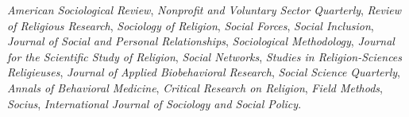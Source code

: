  \emph{American Sociological Review},
 \emph{Nonproﬁt and Voluntary Sector Quarterly},
 \emph{Review of Religious Research},
 \emph{Sociology of Religion},
 \emph{Social Forces},
 \emph{Social Inclusion},
 \emph{Journal of Social and Personal Relationships},
 \emph{Sociological Methodology},
 \emph{Journal for the Scientiﬁc Study of Religion},
 \emph{Social Networks},
 \emph{Studies in Religion-Sciences Religieuses},
 \emph{Journal of Applied Biobehavioral Research},
 \emph{Social Science Quarterly},
 \emph{Annals of Behavioral Medicine},
 \emph{Critical Research on Religion},
 \emph{Field Methods},
 \emph{Socius},
 \emph{International Journal of Sociology and Social Policy}.
